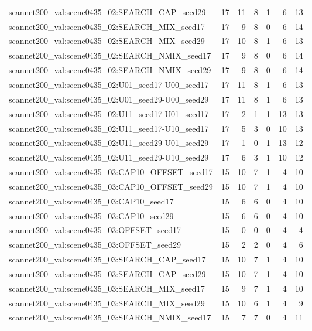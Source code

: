 \begin{table}[t]
\begin{tabular}{lrrrrrr}
scannet200\_val:scene0435\_02:SEARCH\_CAP\_seed29 & 17 & 11 & 8 & 1 & 6 & 13 \\
scannet200\_val:scene0435\_02:SEARCH\_MIX\_seed17 & 17 & 9 & 8 & 0 & 6 & 14 \\
scannet200\_val:scene0435\_02:SEARCH\_MIX\_seed29 & 17 & 10 & 8 & 1 & 6 & 13 \\
scannet200\_val:scene0435\_02:SEARCH\_NMIX\_seed17 & 17 & 9 & 8 & 0 & 6 & 14 \\
scannet200\_val:scene0435\_02:SEARCH\_NMIX\_seed29 & 17 & 9 & 8 & 0 & 6 & 14 \\
scannet200\_val:scene0435\_02:U01\_seed17-U00\_seed17 & 17 & 11 & 8 & 1 & 6 & 13 \\
scannet200\_val:scene0435\_02:U01\_seed29-U00\_seed29 & 17 & 11 & 8 & 1 & 6 & 13 \\
scannet200\_val:scene0435\_02:U11\_seed17-U01\_seed17 & 17 & 2 & 1 & 1 & 13 & 13 \\
scannet200\_val:scene0435\_02:U11\_seed17-U10\_seed17 & 17 & 5 & 3 & 0 & 10 & 13 \\
scannet200\_val:scene0435\_02:U11\_seed29-U01\_seed29 & 17 & 1 & 0 & 1 & 13 & 12 \\
scannet200\_val:scene0435\_02:U11\_seed29-U10\_seed29 & 17 & 6 & 3 & 1 & 10 & 12 \\
scannet200\_val:scene0435\_03:CAP10\_OFFSET\_seed17 & 15 & 10 & 7 & 1 & 4 & 10 \\
scannet200\_val:scene0435\_03:CAP10\_OFFSET\_seed29 & 15 & 10 & 7 & 1 & 4 & 10 \\
scannet200\_val:scene0435\_03:CAP10\_seed17 & 15 & 6 & 6 & 0 & 4 & 10 \\
scannet200\_val:scene0435\_03:CAP10\_seed29 & 15 & 6 & 6 & 0 & 4 & 10 \\
scannet200\_val:scene0435\_03:OFFSET\_seed17 & 15 & 0 & 0 & 0 & 4 & 4 \\
scannet200\_val:scene0435\_03:OFFSET\_seed29 & 15 & 2 & 2 & 0 & 4 & 6 \\
scannet200\_val:scene0435\_03:SEARCH\_CAP\_seed17 & 15 & 10 & 7 & 1 & 4 & 10 \\
scannet200\_val:scene0435\_03:SEARCH\_CAP\_seed29 & 15 & 10 & 7 & 1 & 4 & 10 \\
scannet200\_val:scene0435\_03:SEARCH\_MIX\_seed17 & 15 & 9 & 7 & 1 & 4 & 10 \\
scannet200\_val:scene0435\_03:SEARCH\_MIX\_seed29 & 15 & 10 & 6 & 1 & 4 & 9 \\
scannet200\_val:scene0435\_03:SEARCH\_NMIX\_seed17 & 15 & 7 & 7 & 0 & 4 & 11 \\

\end{tabular}
\end{table}
